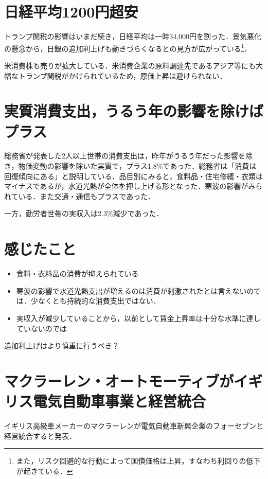 \documentclass{ltjsarticle}
\begin{document}
\section{日経平均1200円超安}

トランプ関税の影響はいまだ続き，日経平均は一時34,000円を割った．景気悪化の懸念から，日銀の追加利上げも動きづらくなるとの見方が広がっている\footnote{また，リスク回避的な行動によって国債価格は上昇，すなわち利回りの低下が起きている．}．

米消費株も売りが拡大している．米消費企業の原料調達先であるアジア等にも大幅なトランプ関税がかけられているため，原価上昇は避けられない．



\section{実質消費支出，うるう年の影響を除けばプラス}

総務省が発表した2人以上世帯の消費支出は，昨年がうるう年だった影響を除き，物価変動の影響を除いた実質で，プラス1.8\%であった．総務省は「消費は回復傾向にある」と説明している．品目別にみると，食料品・住宅修繕・衣類はマイナスであるが，水道光熱が全体を押し上げる形となった．寒波の影響がみられている．また交通・通信もプラスであった．

一方，勤労者世帯の実収入は2.3\%減少であった．


\section{感じたこと}

\begin{itemize}
  \item 食料・衣料品の消費が抑えられている
  \item 寒波の影響で水道光熱支出が増えるのは消費が刺激されたとは言えないのでは．少なくとも持続的な消費支出ではない．
  \item 実収入が減少していることから，以前として賃金上昇率は十分な水準に達していないのでは
\end{itemize}追加利上げはより慎重に行うべき？




\section{マクラーレン・オートモーティブがイギリス電気自動車事業と経営統合}

イギリス高級車メーカーのマクラーレンが電気自動車新興企業のフォーセブンと経営統合すると発表．
\end{document}
